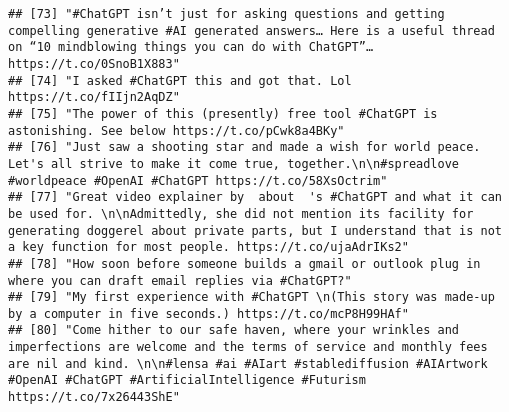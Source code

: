 \documentclass[
]{article}
\begin{document}
\begin{verbatim}
## [73] "#ChatGPT isn’t just for asking questions and getting compelling generative #AI generated answers… Here is a useful thread on “10 mindblowing things you can do with ChatGPT”… https://t.co/0SnoB1X883"                                                                                                                                
## [74] "I asked #ChatGPT this and got that. Lol https://t.co/fIIjn2AqDZ"                                                                                                                                                                                                                                                                      
## [75] "The power of this (presently) free tool #ChatGPT is astonishing. See below https://t.co/pCwk8a4BKy"                                                                                                                                                                                                                                   
## [76] "Just saw a shooting star and made a wish for world peace. Let's all strive to make it come true, together.\n\n#spreadlove #worldpeace #OpenAI #ChatGPT https://t.co/58XsOctrim"                                                                                                                                                       
## [77] "Great video explainer by  about  's #ChatGPT and what it can be used for. \n\nAdmittedly, she did not mention its facility for generating doggerel about private parts, but I understand that is not a key function for most people. https://t.co/ujaAdrIKs2"                                                                         
## [78] "How soon before someone builds a gmail or outlook plug in where you can draft email replies via #ChatGPT?"                                                                                                                                                                                                                            
## [79] "My first experience with #ChatGPT \n(This story was made-up by a computer in five seconds.) https://t.co/mcP8H99HAf"                                                                                                                                                                                                                  
## [80] "Come hither to our safe haven, where your wrinkles and imperfections are welcome and the terms of service and monthly fees are nil and kind. \n\n#lensa #ai #AIart #stablediffusion #AIArtwork #OpenAI #ChatGPT #ArtificialIntelligence #Futurism https://t.co/7x26443ShE"                                                            

\end{verbatim}
\end{document}
